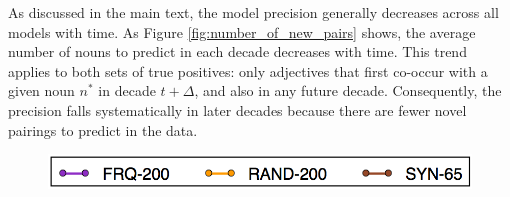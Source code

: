 \documentclass[output=paper]{langsci/langscibook}
\begin{document}

As discussed in the main text, the model precision generally decreases across all models with time. As Figure \ref{fig:number_of_new_pairs} shows, the average number of nouns to predict in each decade decreases with time.
This trend applies to both sets of true positives: only adjectives that first co-occur with a given noun $n^*$ in decade $t + \Delta$, and also in any future decade.
Consequently, the precision falls systematically in later decades because there are fewer novel pairings to predict in the data. 


\begin{figure}
\begin{minipage}{\textwidth}
  \centering
  \includegraphics[width=.50\linewidth]{figures/GREWAL_legend_dataset.png}
\end{minipage}


\end{figure}
\end{document}
